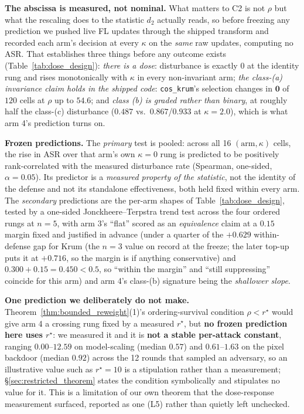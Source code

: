 \documentclass{article}
\begin{document}
\textbf{The abscissa is measured, not nominal.} What matters to C2 is not $\rho$ but what the rescaling does to the statistic $d_2$ actually reads, so before freezing any prediction we pushed live FL updates through the shipped transform and recorded each arm's decision at every $\kappa$ on the \emph{same} raw updates, computing no ASR. That establishes three things before any outcome exists (Table~\ref{tab:dose_design}): \emph{there is a dose}: disturbance is exactly $0$ at the identity rung and rises monotonically with $\kappa$ in every non-invariant arm; \emph{the class-(a) invariance claim holds in the shipped code}: \texttt{cos\_krum}'s selection changes in $\mathbf{0}$ of $120$ cells at $\rho$ up to $54.6$; and \emph{class (b) is graded rather than binary}, at roughly half the class-(c) disturbance ($0.487$ vs.\ $0.867$/$0.933$ at $\kappa{=}2.0$), which is what arm 4's prediction turns on.

\textbf{Frozen predictions.} The \emph{primary} test is pooled: across all 16 $(\text{arm},\kappa)$ cells, the rise in ASR over that arm's own $\kappa{=}0$ rung is predicted to be positively rank-correlated with the measured disturbance rate (Spearman, one-sided, $\alpha = 0.05$). Its predictor is a \emph{measured property of the statistic}, not the identity of the defense and not its standalone effectiveness, both held fixed within every arm. The \emph{secondary} predictions are the per-arm shapes of Table~\ref{tab:dose_design}, tested by a one-sided Jonckheere--Terpstra trend test across the four ordered rungs at $n{=}5$, with arm 3's ``flat'' scored as an \emph{equivalence} claim at a $0.15$ margin fixed and justified in advance (under a quarter of the $+0.629$ within-defense gap for Krum (the $n{=}3$ value on record at the freeze; the later top-up puts it at $+0.716$, so the margin is if anything conservative) and $0.300+0.15 = 0.450 < 0.5$, so ``within the margin'' and ``still suppressing'' coincide for this arm) and arm 4's class-(b) signature being the \emph{shallower slope}.

\textbf{One prediction we deliberately do not make.} Theorem~\ref{thm:bounded_reweight}(1)'s ordering-survival condition $\rho < r^\star$ would give arm 4 a crossing rung fixed by a measured $r^\star$, but \textbf{no frozen prediction here uses $r^\star$}: we measured it and it is \textbf{not a stable per-attack constant}, ranging $0.00$--$12.59$ on model-scaling (median $0.57$) and $0.61$--$1.63$ on the pixel backdoor (median $0.92$) across the 12 rounds that sampled an adversary, so an illustrative value such as $r^\star{=}10$ is a stipulation rather than a measurement; §\ref{sec:restricted_theorem} states the condition symbolically and stipulates no value for it. This is a limitation of our own theorem that the dose-response measurement surfaced, reported as one (L5) rather than quietly left unchecked.
\end{document}
